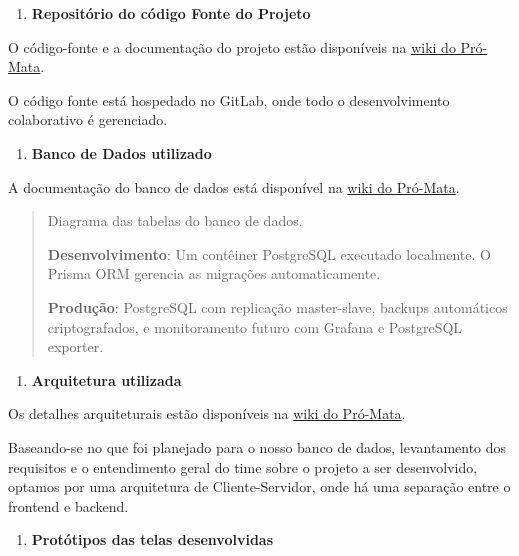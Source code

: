 \begin{enumerate}
\def\labelenumi{\arabic{enumi}.}
\item
  \textbf{Repositório do código Fonte do Projeto}
\end{enumerate}

O código-fonte e a documentação do projeto estão disponíveis na
\href{https://tools.ages.pucrs.br/pro-mata}{wiki do Pró-Mata}.

O código fonte está hospedado no GitLab, onde todo o desenvolvimento
colaborativo é gerenciado.

\begin{enumerate}
\def\labelenumi{\arabic{enumi}.}
\setcounter{enumi}{1}
\item
  \textbf{Banco de Dados utilizado}
\end{enumerate}

A documentação do banco de dados está disponível na
\href{https://tools.ages.pucrs.br/pro-mata/wiki/-/wikis/Banco\%20de\%20Dados}{wiki do Pró-Mata}.

\begin{quote}
Diagrama das tabelas do banco de dados.

\textbf{Desenvolvimento}: Um contêiner PostgreSQL executado localmente. O Prisma
ORM gerencia as migrações automaticamente.

\textbf{Produção}: PostgreSQL com replicação master-slave, backups
automáticos criptografados, e monitoramento futuro com Grafana e
PostgreSQL exporter.
\end{quote}

\begin{enumerate}
\def\labelenumi{\arabic{enumi}.}
\setcounter{enumi}{2}
\item
  \textbf{Arquitetura utilizada}
\end{enumerate}

Os detalhes arquiteturais estão disponíveis na
\href{https://tools.ages.pucrs.br/pro-mata/wiki/-/wikis/Arquitetura}{wiki do Pró-Mata}.

Baseando-se no que foi planejado para o nosso banco de dados,
levantamento dos requisitos e o entendimento geral do time sobre o
projeto a ser desenvolvido, optamos por uma arquitetura de
Cliente-Servidor, onde há uma separação entre o frontend e backend.

\begin{enumerate}
\def\labelenumi{\arabic{enumi}.}
\setcounter{enumi}{3}
\item
  \textbf{Protótipos das telas desenvolvidas}
\end{enumerate}

